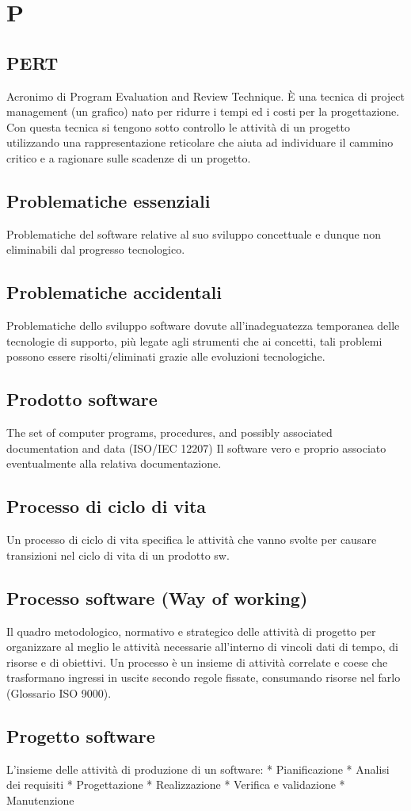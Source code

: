 \documentclass[a4paper]{report}
\newcommand{\mychapter}[2]{
	\setcounter{chapter}{#1}
	\setcounter{section}{0}
	\setcounter{subsection}{1}
	\chapter*{#2}
	\addcontentsline{toc}{chapter}{#2}
}
\begin{document}
\mychapter{11}{P}

\section{PERT} Acronimo di Program Evaluation and Review Technique. È una tecnica di project management (un grafico) nato per ridurre i tempi ed i costi per la progettazione. Con questa tecnica si tengono sotto controllo le attività di un progetto utilizzando una rappresentazione reticolare che aiuta ad individuare il cammino critico e a ragionare sulle scadenze di un progetto.
\section{Problematiche essenziali} Problematiche del software relative al suo sviluppo concettuale e dunque non eliminabili dal progresso tecnologico.
\section{Problematiche accidentali} Problematiche dello sviluppo software dovute all’inadeguatezza temporanea delle tecnologie di supporto, più legate agli strumenti che ai concetti, tali problemi possono essere risolti/eliminati grazie alle evoluzioni tecnologiche.
\section{Prodotto software} The set of computer programs, procedures, and possibly associated documentation and data (ISO/IEC 12207) Il software vero e proprio associato eventualmente alla relativa documentazione.
\section{Processo di ciclo di vita} Un processo di ciclo di vita specifica le attività che vanno svolte per causare transizioni nel ciclo di vita di un prodotto sw.
\section{Processo software (Way of working)} Il quadro metodologico, normativo e strategico delle attività di progetto per organizzare al meglio le attività necessarie all’interno di vincoli dati di tempo, di risorse e di obiettivi. Un processo è un insieme di attività correlate e coese che trasformano ingressi in uscite secondo regole fissate, consumando risorse nel farlo (Glossario ISO 9000).
\section{Progetto software} L’insieme delle attività di produzione di un software:
  * Pianificazione
  * Analisi dei requisiti
  * Progettazione
  * Realizzazione
  * Verifica e validazione
  * Manutenzione
\end{document}
